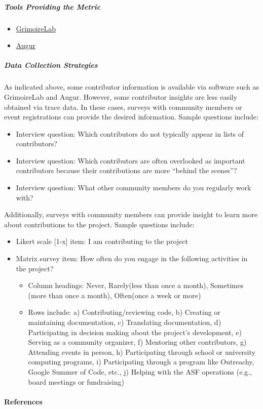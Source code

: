 \hypertarget{tools-providing-the-metric}{%
\subparagraph{Tools Providing the
Metric}\label{tools-providing-the-metric}}

\begin{itemize}
\tightlist
\item
  \href{https://chaoss.github.io/grimoirelab/}{GrimoireLab}
\item
  \href{http://augur.osshealth.io/api_docs/\#api-Evolution-Contributors_Repo_}{Augur}
\end{itemize}

\hypertarget{data-collection-strategies}{%
\subparagraph{Data Collection
Strategies}\label{data-collection-strategies}}

As indicated above, some contributor information is available via
software such as GrimoireLab and Augur. However, some contributor
insights are less easily obtained via trace data. In these cases,
surveys with community members or event registrations can provide the
desired information. Sample questions include:

\begin{itemize}
\tightlist
\item
  Interview question: Which contributors do not typically appear in
  lists of contributors?
\item
  Interview question: Which contributors are often overlooked as
  important contributors because their contributions are more ``behind
  the scenes''?
\item
  Interview question: What other community members do you regularly work
  with?
\end{itemize}

Additionally, surveys with community members can provide insight to
learn more about contributions to the project. Sample questions include:

\begin{itemize}
\tightlist
\item
  Likert scale {[}1-x{]} item: I am contributing to the project
\item
  Matrix survey item: How often do you engage in the following
  activities in the project?

  \begin{itemize}
  \tightlist
  \item
    Column headings: Never, Rarely(less than once a month), Sometimes
    (more than once a month), Often(once a week or more)
  \item
    Rows include: a) Contributing/reviewing code, b) Creating or
    maintaining documentation, c) Translating documentation, d)
    Participating in decision making about the project's development, e)
    Serving as a community organizer, f) Mentoring other contributors,
    g) Attending events in person, h) Participating through school or
    university computing programs, i) Participating through a program
    like Outreachy, Google Summer of Code, etc., j) Helping with the ASF
    operations (e.g., board meetings or fundraising)
  \end{itemize}
\end{itemize}

\hypertarget{references}{%
\paragraph{References}\label{references}}
